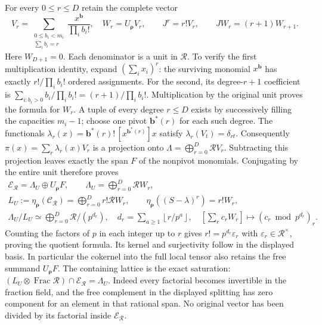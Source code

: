 For every \(0\leq r\leq D\) retain the complete vector
\[
 V_r=\sum_{\substack{0\leq b_i<m_i\\\sum_i b_i=r}}
               \frac{x^{\mathbf b}}{\prod_i b_i!},\quad
 W_r=U_{\boldsymbol\rho}V_r,
 \qquad J^r=r!V_r,
 \qquad JW_r=(r+1)W_{r+1}.
\tag{PC30b}\label{eq:pc30b-update}
\]
Here \(W_{D+1}=0\).  Each denominator is a unit in
\(\mathscr R\).  To verify the first multiplication identity,
expand \((\sum_i x_i)^r\): the surviving monomial
\(x^{\mathbf b}\) has exactly \(r!/\prod_i b_i!\)
ordered assignments.  For the second, its degree-\(r+1\)
coefficient is
\(\sum_{i:b_i>0}b_i/\prod_i b_i!=(r+1)/\prod_i b_i!\).
Multiplication by the original unit proves the formula for
\(W_r\).  A tuple of every degree \(r\leq D\) exists by
successively filling the capacities \(m_i-1\); choose one
pivot \(\mathbf b^*(r)\) for each such degree.  The functionals
\(\lambda_r(x)=\mathbf b^*(r)!\,[x^{\mathbf b^*(r)}]x\)
satisfy \(\lambda_r(V_t)=\delta_{rt}\).  Consequently
\(\pi(x)=\sum_r\lambda_r(x)V_r\) is a projection onto
\(\Lambda=\bigoplus_{r=0}^D\mathscr R V_r\).
Subtracting this projection leaves exactly the span \(F\)
of the nonpivot monomials.  Conjugating by the entire unit
therefore proves
\[
\begin{gathered}
 \mathcal E_{\mathscr R}=\Lambda_U\oplus U_{\boldsymbol\rho}F,
 \qquad \Lambda_U=\bigoplus_{r=0}^D\mathscr R W_r,\\
 L_U:=\eta_{\boldsymbol\rho}(\mathcal C_{\mathscr R})
       =\bigoplus_{r=0}^D r!\mathscr R W_r,
 \qquad
 \eta_{\boldsymbol\rho}((S-\lambda)^r)=r!W_r,\\
 \Lambda_U/L_U\simeq\bigoplus_{r=0}^D\mathscr R/(p^{d_r}),
 \quad d_r=\sum_{a\geq1}\left\lfloor r/p^a\right\rfloor,
 \quad [\sum_r c_rW_r]\longmapsto(c_r\bmod p^{d_r})_r.
\end{gathered}
\tag{PC30c}\label{eq:pc30c-update}
\]
Counting the factors of \(p\) in each integer up to \(r\)
gives \(r!=p^{d_r}\varepsilon_r\) with
\(\varepsilon_r\in\mathscr R^\times\), proving the quotient
formula.  Its kernel and surjectivity follow in the displayed
basis.  In particular the cokernel into the full local tensor
also retains the free summand \(U_{\boldsymbol\rho}F\).
The containing lattice is the exact saturation:
\((L_U\otimes\operatorname{Frac}\mathscr R)\cap
\mathcal E_{\mathscr R}=\Lambda_U\).  Indeed every factorial
becomes invertible in the fraction field, and the free
complement in the displayed splitting has zero component
for an element in that rational span.  No original vector
has been divided by its factorial inside \(\mathcal E_{\mathscr R}\).

